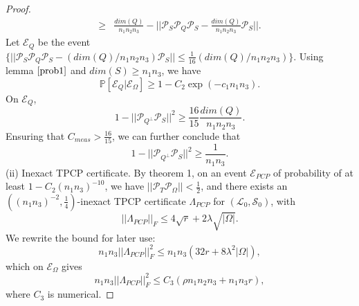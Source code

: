\documentclass[journal,transmag]{IEEEtran}
\theoremstyle{plain}
\begin{document}
\begin{proof}
\begin{equation}
\begin{split}
\ge& \frac{dim(Q)}{n_1 n_2 n_3}-||\mathcal{P}_S\mathcal{P}_Q\mathcal{P}_S-\frac{dim(Q)}{n_1 n_2 n_3}\mathcal{P}_S||.
\end{split}
\end{equation}
Let $\mathcal{E}_Q$ be the event $\{||\mathcal{P}_S \mathcal{P}_Q \mathcal{P}_S-(dim(Q)/n_1 n_2 n_3)\mathcal{P}_S||\le \frac{1}{16}(dim(Q)/n_1 n_2 n_3)\}. $ Using lemma $\ref{prob1}$ and $dim(S)\ge n_1 n_3$, we have
\begin{equation}
\mathbb{P}[\mathcal{E}_Q | \mathcal{E}_{\Omega}]\ge 1- C_2 \exp(-c_1 n_1 n_3).
\end{equation}
On $\mathcal{E}_Q$,
\begin{equation}
1-||\mathcal{P}_{Q^{\bot}}\mathcal{P}_S||^2 \ge\frac{16}{15}\frac{dim(Q)}{n_1 n_2 n_3}.
\end{equation}
Ensuring that $C_{meas}>\frac{16}{15}$, we can further conclude that
\begin{equation}
1-||\mathcal{P}_{Q^{\bot}}\mathcal{P}_S||^2 \ge \frac{1}{n_1 n_3}.
\end{equation}
(ii) Inexact TPCP certificate. By theorem 1, on an event $\mathcal{E}_{PCP}$ of probability of at least $1-C_2 (n_1 n_3)^{-10}$, we have $||\mathcal{P}_T\mathcal{P}_{\Omega}||<\frac{1}{2}$, and there exists an $((n_1 n_3)^{-2},\frac{1}{4})$-inexact TPCP certificate $\Lambda_{PCP}$ for $(\mathcal{L}_0,\mathcal{S}_0)$, with
\begin{equation}
||\Lambda_{PCP}||_F \le 4\sqrt{r}+2\lambda\sqrt{|\Omega|}.
\end{equation}
We rewrite the bound for later use:
\begin{equation}
n_1 n_3||\Lambda_{PCP}||_F^2 \le n_1 n_3(32{r}+8\lambda^2|\Omega|),
\end{equation}
which on $\mathcal{E}_{\Omega}$ gives
\begin{equation}
n_1 n_3||\Lambda_{PCP}||_F^2 \le C_3(\rho n_1 n_2 n_3 + n_1 n_3 r),
\end{equation}
where $C_3$ is numerical.


\end{proof}
\end{document}
